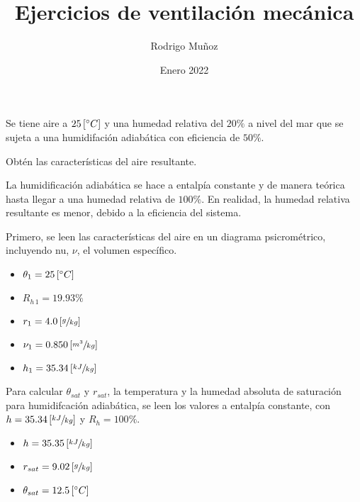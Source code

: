 \documentclass[11pt]{article}
\title{Ejercicios de ventilación mecánica}
\author{Rodrigo Muñoz}
\date{Enero 2022}
\begin{document}
\maketitle

\section{}

Se tiene aire a $ 25 \left[ \degree C \right] $ y una humedad relativa del $ 20\% $ a nivel del mar que se sujeta a una humidifación adiabática con eficiencia de $ 50\% $. 

Obtén las características del aire resultante.

La humidificación adiabática se hace a entalpía constante y de manera teórica hasta llegar a una humedad relativa de $ 100\% $. En realidad, la humedad relativa resultante es menor, debido a la eficiencia del sistema.

Primero, se leen las características del aire en un diagrama psicrométrico, incluyendo nu, $ \nu $, el volumen específico.

\begin{itemize}
    \item
	$ \theta _1 = 25 \left[ \degree C \right] $

    \item
	$ R_{ h \, 1 } = 19.93\% $

    \item
	$ r_1 = 4.0 \left[ \sfrac{ g }{ kg } \right] $
	
    \item
    $ \nu _1 = 0.850 \left[ \sfrac{ m ^3 }{ kg } \right] $
	
    \item
    $ h_1 = 35.34 \left[ \sfrac{ kJ }{ kg } \right] $

\end{itemize}

Para calcular $ \theta _{ sat } $ y $ r_{ sat } $, la temperatura y la humedad absoluta de saturación para humidifcación adiabática, se leen los valores a entalpía constante, con $ h = 35.34 \left[ \sfrac{ kJ }{ kg } \right] $ y $ R_h = 100\% $.

\begin{itemize}
    \item
    $ h = 35.35 \left[ \sfrac{ kJ }{ kg } \right] $
    
    \item 
    $ r_{ sat } = 9.02 \left[ \sfrac{ g }{ kg } \right] $
    
    \item
    $ \theta _{ sat } = 12.5 \left[ \degree C \right] $

\end{itemize}
\end{document}
